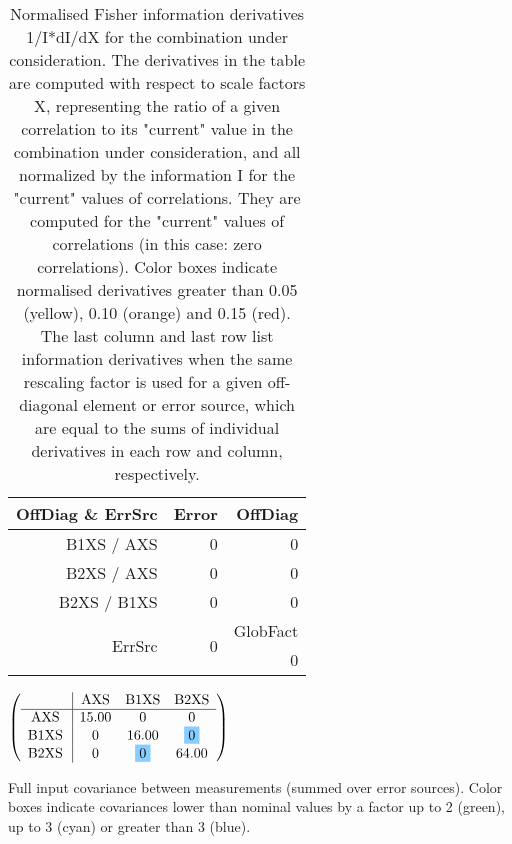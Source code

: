 \begin{table}[H]
\scriptsize
\begin{center}
\renewcommand{\arraystretch}{1.1}
\begin{tabular}{|r|r|r|}
\hline
 OffDiag \& ErrSrc & {\tiny Error} & OffDiag\\
\hline
B1XS / AXS &  0 &  0 \\
B2XS / AXS &  0 &  0 \\
B2XS / B1XS &  0 &  0 \\
\hline
\multirow{2}{*}{ErrSrc} & \multirow{2}{*}{ 0} & GlobFact\\
 & &  0 \\
\hline
\end{tabular}
\renewcommand{\arraystretch}{1}
\caption{Normalised Fisher information derivatives 1/I*dI/dX for the combination under consideration. The derivatives in the table are computed with respect to scale factors X, representing the ratio of a given correlation to its "current" value in the combination under consideration, and all normalized by the information I for the "current" values of correlations. They are computed for the "current" values of correlations (in this case: zero correlations). Color boxes indicate normalised derivatives greater than 0.05 (yellow), 0.10 (orange) and 0.15 (red). The last column and last row list information derivatives when the same rescaling factor is used for a given off-diagonal element or error source, which are equal to the sums of individual derivatives in each row and column, respectively.}
\end{center}
\end{table}
\begin{table}[H]
\scriptsize
\begin{center}
\renewcommand{\arraystretch}{1.1}
\begin{math}\left(\begin{array}{c|ccc}
 & \mathrm{AXS} & 
\mathrm{B1XS} & 
\mathrm{B2XS} \\
\hline
\mathrm{AXS} \hspace*{2pt} &      15.00 &  0 &  0 \\
\mathrm{B1XS} \hspace*{2pt} &  0 &      16.00 &  \colorbox{SkyBlue1}{$ 0$} \\
\mathrm{B2XS} \hspace*{2pt} &  0 &  \colorbox{SkyBlue1}{$ 0$} &      64.00 \\
\end{array}\right)\end{math}
\caption{Full input covariance between measurements (summed over error sources). Color boxes indicate covariances lower than nominal values by a factor up to 2 (green), up to 3 (cyan) or greater than 3 (blue).}
\renewcommand{\arraystretch}{1}
\end{center}
\end{table}
